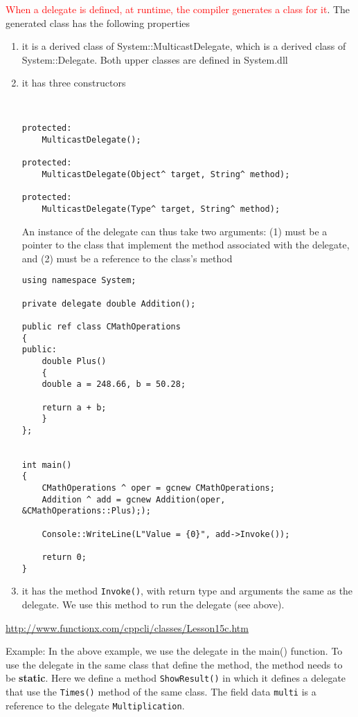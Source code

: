 \textcolor{red}{When a delegate is defined, at runtime, the compiler generates
a class for it}. The generated class has the following properties
\begin{enumerate}
  \item it is a derived class of System::MulticastDelegate, which is a derived
  class of System::Delegate. Both upper classes are defined in System.dll
  
  \item it has three constructors
\begin{verbatim}
  

protected:
    MulticastDelegate();

protected:
    MulticastDelegate(Object^ target, String^ method);

protected:
    MulticastDelegate(Type^ target, String^ method);
\end{verbatim}

An instance of the delegate can thus take two arguments: (1) must be a
pointer to the class that implement the method associated with the delegate, and
(2) must be a reference to the class's method
\begin{verbatim}
using namespace System;

private delegate double Addition();

public ref class CMathOperations
{
public:
    double Plus()
    {
	double a = 248.66, b = 50.28;

	return a + b;
    }
};


int main()
{
    CMathOperations ^ oper = gcnew CMathOperations;
    Addition ^ add = gcnew Addition(oper, &CMathOperations::Plus););
    
    Console::WriteLine(L"Value = {0}", add->Invoke());
    
    return 0;
}
\end{verbatim}
    
    \item it has the method \verb!Invoke()!, with return type and arguments the
    same as the delegate. We use this method to run the delegate (see above).
    

\end{enumerate}
\url{http://www.functionx.com/cppcli/classes/Lesson15c.htm}

Example: In the above example, we use the delegate in the main() function. To
use the delegate in the same class that define the method, the method needs to
be {\bf static}. Here we define a method \verb!ShowResult()! in which it defines
a delegate that use the \verb!Times()! method of the same class. The field data
\verb!multi! is a reference to the delegate \verb!Multiplication!.

